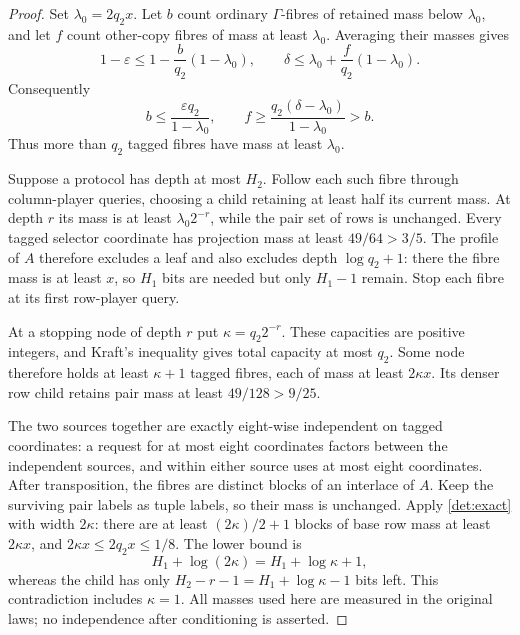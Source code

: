 \documentclass[11pt]{article} \usepackage[utf8]{inputenc}
\theoremstyle{plain} \newtheorem{theorem}{Theorem}[section]
\theoremstyle{definition} \newaliascnt{definition}{theorem}
\begin{document}
\begin{proof}
Set $\lambda_0=2q_2x$. Let $b$ count ordinary $\Gamma$-fibres of retained
mass below $\lambda_0$, and let $f$ count other-copy fibres of mass at least
$\lambda_0$. Averaging their masses gives
\[
1-\varepsilon\le1-\frac b{q_2}(1-\lambda_0),\qquad
\delta\le\lambda_0+\frac f{q_2}(1-\lambda_0).
\]
Consequently
\[
b\le\frac{\varepsilon q_2}{1-\lambda_0},\qquad
f\ge\frac{q_2(\delta-\lambda_0)}{1-\lambda_0}>b.
\]
Thus more than $q_2$ tagged fibres have mass at least $\lambda_0$.

Suppose a protocol has depth at most $H_2$. Follow each such fibre through
column-player queries, choosing a child retaining at least half its current
mass. At depth $r$ its mass is at least $\lambda_0 2^{-r}$, while the pair
set of rows is unchanged. Every tagged selector coordinate has projection
mass at least $49/64>3/5$. The profile of $A$ therefore excludes a leaf and
also excludes depth $\log q_2+1$: there the fibre mass is at least $x$, so
$H_1$ bits are needed but only $H_1-1$ remain. Stop each fibre at its first
row-player query.

At a stopping node of depth $r$ put $\kappa=q_2 2^{-r}$. These capacities are
positive integers, and Kraft's inequality gives total capacity at most $q_2$.
Some node therefore holds at least $\kappa+1$ tagged fibres, each of mass at
least $2\kappa x$. Its denser row child retains pair mass at least
$49/128>9/25$.

The two sources together are exactly eight-wise independent on tagged
coordinates: a request for at most eight coordinates factors between the
independent sources, and within either source uses at most eight coordinates.
After transposition, the fibres are distinct blocks of an interlace of $A$.
Keep the surviving pair labels as tuple labels, so their mass is unchanged.
Apply \cref{det:exact} with width $2\kappa$: there are at least
$(2\kappa)/2+1$ blocks of base row mass at least $2\kappa x$, and
$2\kappa x\le2q_2x\le1/8$. The lower bound is
\[
H_1+\log(2\kappa)=H_1+\log\kappa+1,
\]
whereas the child has only $H_2-r-1=H_1+\log\kappa-1$ bits left.
This contradiction includes $\kappa=1$. All masses used here are measured
in the original laws; no independence after conditioning is asserted.
\end{proof}
\end{document}
